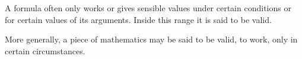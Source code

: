 A formula often only works or gives sensible values under
certain conditions or for certain values of its arguments.
Inside this range it is said to be valid.
\par
More generally, a piece of mathematics may be said to be valid,
to work, only in certain circumstances.